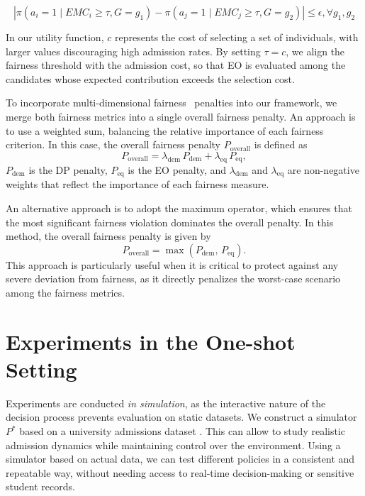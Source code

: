 \documentclass[acmlarge]{acmart-ecaf}
\newcommand {\pol} {\pi}
\begin{document}
\begin{equation}
|\pol (a_i =1 \mid EMC_i \geq \tau , G= g_1)
 - \pol (a_j =1 \mid EMC_j \geq \tau , G= g_2)| \leq \epsilon, \forall g_1, g_2
\end{equation}

In our utility function, $c$ represents the cost of selecting a set of individuals, with larger values discouraging high admission rates. By setting $\tau = c$, we align the fairness threshold with the admission cost, so that EO is evaluated among the candidates whose expected contribution exceeds the selection cost. %


To incorporate multi-dimensional fairness~\cite{kleinberg2016inherent} penalties into our framework, we merge both fairness metrics into a single overall fairness penalty. An approach is to use a weighted sum,  balancing the relative importance of each fairness criterion. In this case, the overall fairness penalty \(P_{\text{overall}}\) is defined as
\begin{equation} \label{eq:group}
P_{\text{overall}} = \lambda_{\text{dem}} \, P_{\text{dem}} + \lambda_{\text{eq}} \, P_{\text{eq}},
\end{equation}
 \(P_{\text{dem}}\) is the DP penalty, \(P_{\text{eq}}\) is the EO penalty, and \(\lambda_{\text{dem}}\) and \(\lambda_{\text{eq}}\) are non-negative weights that reflect the importance of each fairness measure. 

An alternative approach is to adopt the maximum operator, which ensures that the most significant fairness violation dominates the overall penalty. In this method, the overall fairness penalty is given by
\begin{equation}
P_{\text{overall}} = \max\left( P_{\text{dem}}, \, P_{\text{eq}} \right).
\end{equation}
This approach is particularly useful when it is critical to protect against any severe deviation from fairness, as it directly penalizes the worst-case scenario among the fairness metrics. 

\section{Experiments in the One-shot Setting}
\label{sec:exp}
Experiments are conducted \emph{in simulation}, as the interactive nature of the decision process prevents evaluation on static datasets. We construct a simulator $P^*$ based on a university admissions dataset \cite{kleine2022meritocracy}. This can allow to study realistic admission dynamics while maintaining control over the environment. Using a simulator based on actual data, we can test different policies in a consistent and repeatable way, without needing access to real-time decision-making or sensitive student records.
\end{document}

